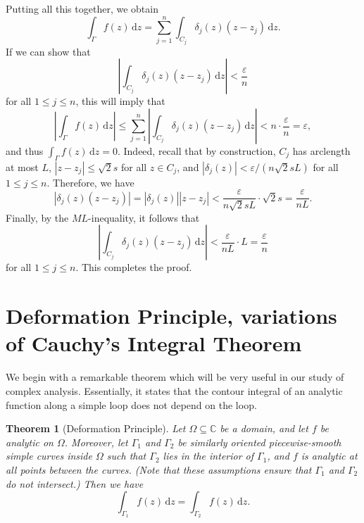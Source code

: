 \documentclass[10pt]{article}
\makeatletter
\newcommand{\eps}{\varepsilon}
\newcommand{\C}{\mathbb{C}}
\newcommand{\dd}{\,\mathrm{d}}
\theoremstyle{newstyle}
\newtheorem{thm}{Theorem}[section]
\newenvironment{pf}[1][\proofname]{\par
  \pushQED{\qed}%
  \normalfont \topsep0\p@\relax
  \trivlist
  \item[\hskip\labelsep\scshape
  #1\@addpunct{.}]\ignorespaces
}{%
  \popQED\endtrivlist\@endpefalse
}
\makeatother
\begin{document}
\begin{pf}
Putting all this together, we obtain 
\[ \int_\Gamma f(z)\dd z = \sum_{j=1}^n \int_{C_j} \delta_j(z)(z-z_j)\dd z. \]
If we can show that 
\[ \left| \int_{C_j} \delta_j(z)(z - z_j) \dd z \right| < \frac{\eps}n \]
for all $1 \leq j \leq n$, this will imply that 
\[ \left| \int_\Gamma f(z)\dd z \right| \leq \sum_{j=1}^n \left| \int_{C_j} \delta_j(z) (z - z_j)
\dd z \right| < n \cdot \frac{\eps}n = \eps, \]
and thus $\int_\Gamma f(z) \dd z = 0 $. Indeed, recall that by construction, 
$C_j$ has arclength at most $L$, $|z - z_j| \leq \sqrt2 s$ for all $z \in C_j$, and 
$|\delta_j(z)| < \eps/(n\sqrt2 sL)$ for all $1 \leq j \leq n$. Therefore, we have 
\[ |\delta_j(z) (z - z_j)| = |\delta_j(z)| |z - z_j| < \frac{\eps}{n\sqrt2 sL} \cdot \sqrt2 s 
= \frac{\eps}{nL}. \]
Finally, by the $ML$-inequality, it follows that 
\[ \left| \int_{C_j} \delta_j(z)(z-z_j)\dd z \right| < \frac{\eps}{nL} \cdot L = \frac{\eps}n \]
for all $1 \leq j \leq n$. This completes the proof. 
\end{pf}

\newpage 
\section{Deformation Principle, variations of Cauchy's Integral Theorem}

We begin with a remarkable theorem which will be very useful in our 
study of complex analysis. Essentially, it states that 
the contour integral of an analytic function along a simple loop does not depend on the loop.

\begin{thm}[Deformation Principle]
Let $\Omega \subseteq \C$ be a domain, and let $f$ be analytic on $\Omega$. Moreover, 
let $\Gamma_1$ and $\Gamma_2$ be similarly oriented piecewise-smooth simple curves inside 
$\Omega$ such that $\Gamma_2$ lies in the interior of $\Gamma_1$, and $f$ 
is analytic at all points between the curves. (Note that these assumptions ensure that 
$\Gamma_1$ and $\Gamma_2$ do not intersect.) Then we have 
\[ \int_{\Gamma_1} f(z)\dd z = \int_{\Gamma_2} f(z)\dd z. \]
\end{thm}
\end{document}
